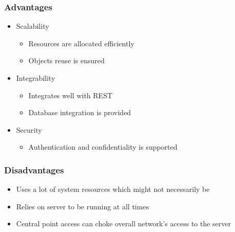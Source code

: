 \documentclass{article}
\begin{document}
	\subsubsection{Advantages}
	\begin{itemize}
	\item Scalability 
		\begin{itemize}
		\item Resources are allocated efficiently
		\item Objects reuse is ensured
		\end{itemize}
	\item Integrability
		\begin{itemize}
			\item Integrates well with REST
			\item Database integration is provided
		\end{itemize}
	\item Security
		\begin{itemize}
		\item Authentication and confidentiality is supported
		\end{itemize}
	\end{itemize}
	
	\subsubsection{Disadvantages}
	\begin{itemize}
	\item Uses a lot of system resources which might not necessarily be 
	\item Relies on server to be running at all times 
	\item Central point access can choke overall network's access to the server
	
	\end{itemize}

	
\end{document}
